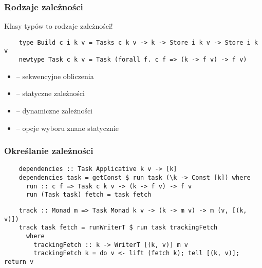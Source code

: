 \begin{frame}[fragile]
  \frametitle{Rodzaje zależności}

  Klasy typów to rodzaje zależności!

  \vspace{1em}
  \begin{lstlisting}
    type Build c i k v = Tasks c k v -> k -> Store i k v -> Store i k v
    newtype Task c k v = Task (forall f. c f => (k -> f v) -> f v)
  \end{lstlisting}

  \begin{itemize}
  \item {} -- sekwencyjne obliczenia
  \item {} -- statyczne zależności
  \item {} -- dynamiczne zależności
  \item {} -- opcje wyboru znane statycznie
  \end{itemize}
\end{frame}

\begin{frame}[fragile]
  \frametitle{Określanie zależności}

  \begin{lstlisting}
    dependencies :: Task Applicative k v -> [k]
    dependencies task = getConst $ run task (\k -> Const [k]) where
      run :: c f => Task c k v -> (k -> f v) -> f v
      run (Task task) fetch = task fetch
  \end{lstlisting}

  \begin{lstlisting}
    track :: Monad m => Task Monad k v -> (k -> m v) -> m (v, [(k, v)])
    track task fetch = runWriterT $ run task trackingFetch
      where
        trackingFetch :: k -> WriterT [(k, v)] m v
        trackingFetch k = do v <- lift (fetch k); tell [(k, v)]; return v
  \end{lstlisting}
\end{frame}

